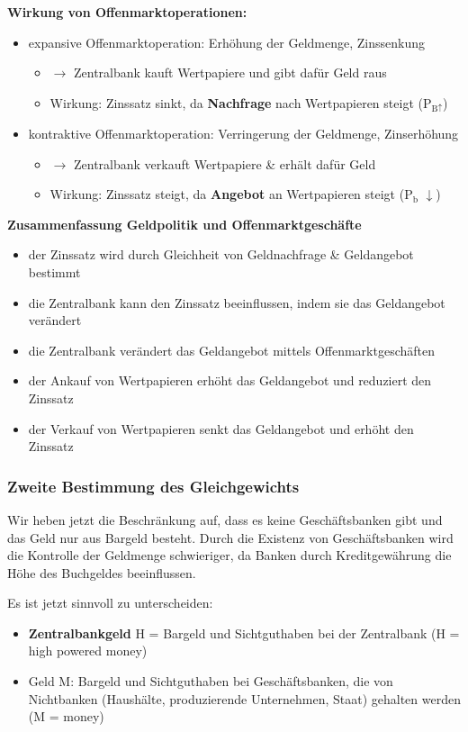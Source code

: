 \documentclass[11pt]{article}
\begin{document}
\begin{enumerate}
\textbf{Wirkung von Offenmarktoperationen:}
\begin{itemize}
\item expansive Offenmarktoperation: Erhöhung der Geldmenge, Zinssenkung
\begin{itemize}
\item \(\rightarrow\) Zentralbank kauft Wertpapiere und gibt dafür Geld raus
\item Wirkung: Zinssatz sinkt, da \textbf{Nachfrage} nach Wertpapieren steigt (P\(_{\text{B}\uparrow}\))
\end{itemize}
\item kontraktive Offenmarktoperation: Verringerung der Geldmenge, Zinserhöhung
\begin{itemize}
\item \(\rightarrow\) Zentralbank verkauft Wertpapiere \& erhält dafür Geld
\item Wirkung: Zinssatz steigt, da \textbf{Angebot} an Wertpapieren steigt (P\(_{\text{b}}\) \(\downarrow\))
\end{itemize}
\end{itemize}

\textbf{Zusammenfassung Geldpolitik und Offenmarktgeschäfte}
\begin{itemize}
\item der Zinssatz wird durch Gleichheit von Geldnachfrage \& Geldangebot bestimmt
\item die Zentralbank kann den Zinssatz beeinflussen, indem sie das Geldangebot verändert
\item die Zentralbank verändert das Geldangebot mittels Offenmarktgeschäften
\item der Ankauf von Wertpapieren erhöht das Geldangebot und reduziert den Zinssatz
\item der Verkauf von Wertpapieren senkt das Geldangebot und erhöht den Zinssatz
\end{itemize}
\end{enumerate}
\subsubsection{Zweite Bestimmung des Gleichgewichts}
\label{sec:org602a700}
Wir heben jetzt die Beschränkung auf, dass es keine Geschäftsbanken gibt und das Geld nur aus Bargeld besteht. Durch die Existenz von Geschäftsbanken wird die Kontrolle der Geldmenge schwieriger, da Banken durch Kreditgewährung die Höhe des Buchgeldes beeinflussen.

Es ist jetzt sinnvoll zu unterscheiden:
\begin{itemize}
\item \textbf{Zentralbankgeld} H = Bargeld und Sichtguthaben bei der Zentralbank (H = high powered money)
\item Geld M: Bargeld und Sichtguthaben bei Geschäftsbanken, die von Nichtbanken (Haushälte, produzierende Unternehmen, Staat) gehalten werden (M = money)
\end{itemize}
\end{document}

